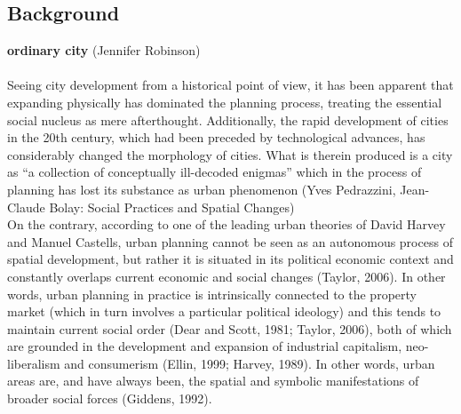 \documentclass[11pt]{report}
\begin{document}
\subsection{Background}
\textbf{ordinary city} (Jennifer Robinson)
\\
\\
 Seeing city development from a historical point of view, it has been apparent that expanding physically has dominated the planning process, treating the essential social nucleus as mere afterthought. Additionally, the rapid development of cities in the 20th century, which had been preceded by technological advances, has considerably changed the morphology of cities. What is therein produced is a city as “a collection of conceptually ill-decoded enigmas” which in the process of planning has lost its substance as urban phenomenon (Yves Pedrazzini, Jean-Claude Bolay: Social Practices and Spatial Changes)
\\
On the contrary, according to one of the leading urban theories of David Harvey and Manuel Castells, urban planning cannot be seen as an autonomous process of spatial development, but rather it is situated in its political economic context and constantly overlaps current economic and social changes  (Taylor, 2006). In other words, urban planning in practice is intrinsically connected to the property market (which in turn involves a particular political ideology) and this tends to maintain current social order (Dear and Scott, 1981; Taylor, 2006), both of which are grounded in the development and expansion of industrial capitalism, neo-liberalism and consumerism (Ellin, 1999; Harvey, 1989). In other words, urban areas are, and have always been, the spatial and symbolic manifestations of broader social forces (Giddens, 1992).
\end{document}
